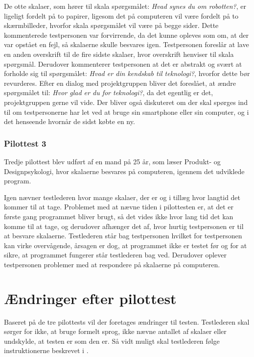 De otte skalaer, som hører til skala spørgsmålet: \textit{Hvad synes du om robotten?}, er ligeligt fordelt på to papirer, ligesom det på computeren vil være fordelt på to skærmbilleder, hvorfor skala spørgsmålet vil være på begge sider. Dette kommenterede testpersonen var forvirrende, da det kunne opleves som om, at der var opstået en fejl, så skalaerne skulle besvares igen. Testpersonen foreslår at lave en anden overskrift til de fire sidste skalaer, hvor overskrift henviser til skala spørgsmål. Derudover kommenterer testpersonen at det er abstrakt og svært at forholde sig til spørgsmålet: \textit{Hvad er din kendskab til teknologi?}, hvorfor dette bør revurderes. Efter en dialog med projektgruppen bliver det foreslået, at ændre spørgsmålet til: \textit{Hvor glad er du for teknologi?}, da det egentlig er det, projektgruppen gerne vil vide. Der bliver også diskuteret om der skal spørges ind til om testpersonerne har let ved at bruge sin smartphone eller sin computer, og i det henseende hvornår de sidst købte en ny. 

\subsubsection*{Pilottest 3}
\label{TestAfSkalaerPilot3}
%
Tredje pilottest blev udført af en mand på 25 år, som læser Produkt- og Designpsykologi, hvor skalaerne besvares på computeren, igennem det udviklede program. 

Igen nævner testlederen hvor mange skalaer, der er og i tillæg hvor langtid det kommer til at tage. Problemet med at nævne tiden i pilottesten er, at det er første gang programmet bliver brugt, så det vides ikke hvor lang tid det kan komme til at tage, og derudover afhænger det af, hvor hurtig testpersonen er til at besvare skalaerne. Testlederen står bag testpersonen hvilket for testpersonen kan virke overvågende, årsagen er dog, at programmet ikke er testet før og for at sikre, at programmet fungerer står testlederen bag ved. Derudover oplever testpersonen problemer med at respondere på skalaerne på computeren.   

\section{Ændringer efter pilottest}
\label{TestAfSkalaerAendringerPilot}
%
Baseret på de tre pilottests vil der foretages ændringer til testen. Testlederen skal sørger for ikke, at bruge formelt sprog, ikke nævne antallet af skalaer eller undskylde, at testen er som den er. Så vidt muligt skal testlederen følge instruktionerne beskrevet i .


